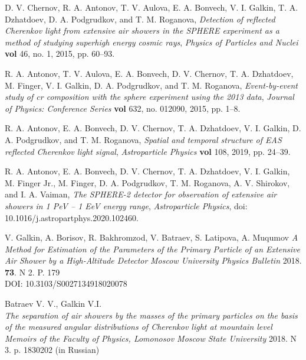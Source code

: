 \documentclass[a4paper,11pt]{article}
\begin{document}



\begin{thebibliography}{99}

D. V. Chernov, R. A. Antonov, T. V. Aulova, E. A. Bonvech, V. I. Galkin, T. A. Dzhatdoev, D. A. Podgrudkov, and T. M. Roganova, \textit{Detection of reflected Cherenkov light from extensive air showers in the SPHERE experiment as a method of studying superhigh energy cosmic rays}, \textit{Physics of Particles and Nuclei} {\bf vol} 46, no. 1, 2015, pp. 60–93.

R. A. Antonov, T. V. Aulova, E. A. Bonvech, D. V. Chernov, T. A. Dzhatdoev, M. Finger, V. I. Galkin, D. A. Podgrudkov, and T. M. Roganova, \textit{Event-by-event study of cr composition with the sphere experiment using the 2013 data}, \textit{Journal of Physics: Conference Series} {\bf vol} 632, no. 012090, 2015, pp. 1–8.

R. A. Antonov, E. A. Bonvech, D. V. Chernov, T. A. Dzhatdoev, V. I. Galkin, D. A. Podgrudkov, and T. M. Roganova, \textit{Spatial and temporal structure of EAS reflected Cherenkov light signal}, \textit{Astroparticle Physics} {\bf vol} 108, 2019, pp. 24–39.

R. A. Antonov, E. A. Bonvech, D. V. Chernov, T. A. Dzhatdoev, V. I. Galkin, M. Finger Jr., M. Finger, D. A. Podgrudkov, T. M. Roganova,  A. V. Shirokov, and I. A. Vaiman, 
\textit{The SPHERE-2 detector for observation of extensive air showers in 1 PeV – 1 EeV energy range}, \textit{Astroparticle Physics},
doi: 10.1016/j.astropartphys.2020.102460.

V. Galkin, A. Borisov, R. Bakhromzod, V. Batraev, S. Latipova, A. Muqumov
\textit{A Method for Estimation of the Parameters of the Primary Particle of an Extensive Air Shower by a High-Altitude Detector}
\textit{Moscow University Physics Bulletin} 2018. {\bf 73}. N 2. P. 179 \\
 DOI: 10.3103/S0027134918020078

Batraev V. V., Galkin V.I. \\
\textit{The separation of air showers by the masses of the primary particles on the basis of the
measured angular distributions of Cherenkov light at mountain level}
\textit{Memoirs of the Faculty of Physics, Lomonosov Moscow State University} 2018. N 3. p. 1830202 (in Russian)


\end{thebibliography}
\end{document}
